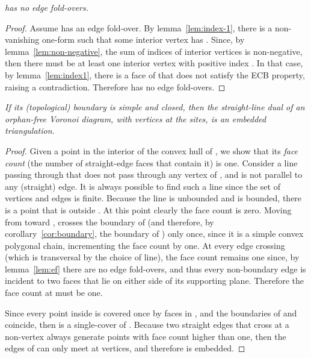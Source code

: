 \documentclass[11pt]{article}
\begin{document}
\emph{
 has no edge fold-overs. }
\begin{proof}
Assume  has an edge fold-over. 
By lemma~\ref{lem:index-1}, there is a non-vanishing one-form
 such that some interior vertex  has . 
Since, by lemma~\ref{lem:non-negative}, the sum of indices of interior vertices is
non-negative,
then there must be
at least one interior vertex  with positive index
. In that case, by lemma~\ref{lem:index1}, there is a face of  that does not satisfy the
ECB property, raising a contradiction. 
Therefore  has no edge fold-overs. 
\end{proof}







\emph{
If its (topological) boundary is simple and closed, 
	then the straight-line dual of an orphan-free Voronoi diagram, 
	with vertices at the sites, 
	is an embedded triangulation. 
}
\begin{proof}


Given a point  in
the interior of the convex hull of , we show that its \emph{face count}
(the number of straight-edge faces that contain it) is one. 
Consider a line  passing through  that does not pass through any vertex of
, and is not parallel to any (straight) edge. 
It is always possible to find such a line since the set of vertices and edges is finite. 
Because the line is unbounded and  is bounded, there is a
point  that is outside . At this point clearly the
face count is zero. 
Moving from  toward ,  crosses the boundary of 
(and therefore, by corollary~\ref{cor:boundary}, the boundary of ) 
only once, since it is a simple convex polygonal chain, incrementing the face
count by one. At every edge crossing (which is transversal by the choice of
line), the face count remains one since, by lemma~\ref{lem:ef} there are no
edge fold-overs, and thus every non-boundary edge is incident to two faces
that lie on either side of its supporting plane. Therefore the face count at
 must be one. 


Since every point inside  is covered once by faces in
,
and the boundaries of  and  coincide, then
 is a single-cover
of . 
Because two straight edges that cross at a non-vertex always generate points with
face count higher than one, then the edges of  can only meet at vertices, and
therefore  is embedded. 
\end{proof}
\end{document}

